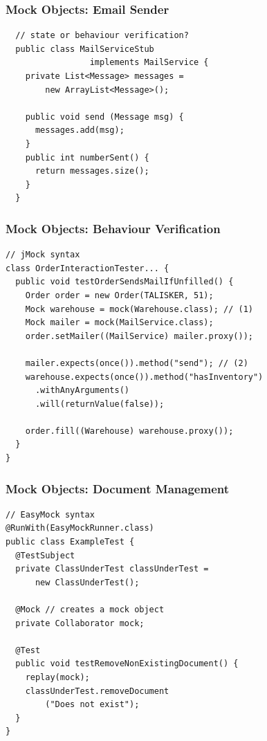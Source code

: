\documentclass{beamer}
\newenvironment{changemargin}[1]{%
  \begin{list}{}{%
    \setlength{\topsep}{0pt}%
    \setlength{\leftmargin}{#1}%
    \setlength{\rightmargin}{1em}
    \setlength{\listparindent}{\parindent}%
    \setlength{\itemindent}{\parindent}%
    \setlength{\parsep}{\parskip}%
  }%
  \item[]}{\end{list}}
\begin{document}
\begin{frame}[fragile]
  \frametitle{Mock Objects: Email Sender}
  \begin{changemargin}{1cm}
{\small
  \begin{lstlisting}
  // state or behaviour verification?
  public class MailServiceStub
                 implements MailService {
    private List<Message> messages =
        new ArrayList<Message>();
    
    public void send (Message msg) {
      messages.add(msg);
    }
    public int numberSent() {
      return messages.size();
    }
  }     
\end{lstlisting}
}
  \end{changemargin}
\end{frame}

\begin{frame}[fragile]
  \frametitle{Mock Objects: Behaviour Verification}
  \begin{changemargin}{1cm}
{\small
  \begin{lstlisting}
// jMock syntax
class OrderInteractionTester... {
  public void testOrderSendsMailIfUnfilled() {
    Order order = new Order(TALISKER, 51);
    Mock warehouse = mock(Warehouse.class); // (1)
    Mock mailer = mock(MailService.class);
    order.setMailer((MailService) mailer.proxy());

    mailer.expects(once()).method("send"); // (2)
    warehouse.expects(once()).method("hasInventory")
      .withAnyArguments()
      .will(returnValue(false));

    order.fill((Warehouse) warehouse.proxy());
  }
}    
\end{lstlisting}
}
  \end{changemargin}
\end{frame}

\begin{frame}[fragile]
  \frametitle{Mock Objects: Document Management}
  \begin{changemargin}{1cm}
{\small
  \begin{lstlisting}
// EasyMock syntax
@RunWith(EasyMockRunner.class)
public class ExampleTest {
  @TestSubject
  private ClassUnderTest classUnderTest =
      new ClassUnderTest();

  @Mock // creates a mock object
  private Collaborator mock;

  @Test
  public void testRemoveNonExistingDocument() {
    replay(mock);
    classUnderTest.removeDocument
        ("Does not exist");
  }
} 
\end{lstlisting}
}
  \end{changemargin}
\end{frame}
\end{document}
